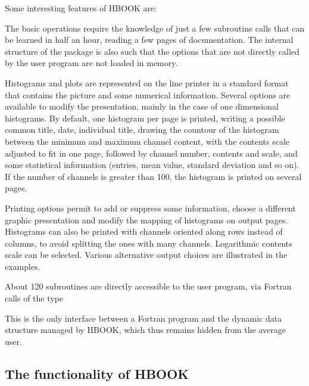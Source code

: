 Some interesting features of HBOOK are:
\begin{UL}
\item The basic operations require the knowledge of just a few
      subroutine calls that can be learned in half an hour, reading a few
      pages of documentation.  
      The internal structure of the
      package is also such that the options that are not directly
      called by the user program are not loaded in memory.
\item Histograms and plots are represented on the line printer in a
      standard format that contains the picture and some numerical 
      information. 
      Several options are available to modify the presentation, 
      mainly in the case of one dimensional histograms.  
      By default, one histogram per page is printed,
      writing a possible common title, date, individual title, drawing
      the countour of the histogram between the minimum and maximum
      channel content, with the contents scale adjusted to fit in one
      page, followed by channel number, contents and scale, and some
      statistical information (entries, mean value, standard deviation
      and so on).  
      If the number of channels is greater than 100, the
      histogram is printed on several pages.
\item Printing options permit to add or suppress some information,
      choose a different graphic presentation and modify the mapping of
      histograms on output pages.  
      Histograms can also be printed with channels
      oriented along rows instead of columns, to avoid splitting the
      ones with many channels. 
      Logarithmic contents scale can be selected.
      Various alternative output choices are illustrated in the examples.
\end{UL}

About 120 subroutines are directly accessible to the user program, via
Fortran calls of the type

\begin{center}
\end{center}

This is the only interface between a Fortran program and the dynamic
data structure managed by HBOOK, which thus
remains hidden from the average user.

\subsection*{The functionality of HBOOK}
      
